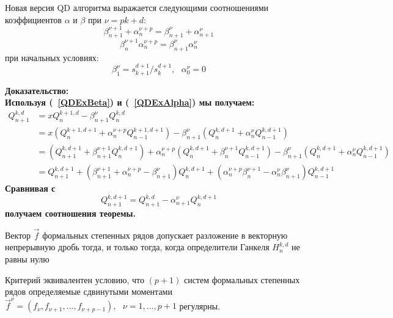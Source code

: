 \begin{teor}
Новая версия QD алгоритма выражается следующими соотношениями
коэффициентов $\alpha$ и $\beta$ при $\nu=pk+d$:
\begin{equation}
\label{QDExRec} \beta_{n+1}^{\nu+1}+\alpha_n^{\nu+p} =
\beta_{n+1}^{\nu}+\alpha_{n+1}^{\nu}
\end{equation}
\begin{equation}
\beta_{n}^{\nu+1}\alpha_n^{\nu+p} =
\beta_{n+1}^{\nu}\alpha_{n}^{\nu}
\end{equation}
при начальных условиях:
\begin{equation}
\beta_1^{\nu} = s^{d+1}_{k+1}/s_{k}^{d+1},\mbox{   }
\alpha_0^{\nu}=0
\end{equation}
\end{teor}
\bf Доказательство: \rm \\
Используя (~\ref{QDExBeta}) и (~\ref{QDExAlpha}) мы получаем:
$$%
\begin{array}{lllllllll}
Q_{n+1}^{k,d} & =xQ_n^{k+1,d}-\beta_{n+1}^{{\nu}} Q_n^{k,d} \\
&
=x(Q_n^{k+1,d+1}+\alpha_n^{\nu+p}Q_{n-1}^{k+1,d+1})-\beta_{n+1}^{{\nu}}
(Q_n^{k,d+1}+\alpha_n^{\nu}Q_{n-1}^{k,d+1}) \\
&
=(Q_{n+1}^{k,d+1}+\beta_{n+1}^{\nu+1}Q_n^{k,d+1})+\alpha_n^{\nu+p}(Q_n^{k,d+1}+\beta_n^{\nu+1}Q_{n-1}^{k,d+1})-\beta_{n+1}^{{\nu}}
(Q_n^{k,d+1}+\alpha_n^{\nu}Q_{n-1}^{k,d+1}) \\
& =
Q_{n+1}^{k,d+1}+(\beta_{n+1}^{\nu+1}+\alpha_{n}^{\nu+p}-\beta_{n+1}^{\nu})Q_n^{k,d+1}+(\alpha_n^{\nu+p}\beta_{n}^{\nu+1}-\alpha_n^{\nu}\beta_{n+1}^{\nu})Q_{n-1}^{k,d+1}
\end{array}
$$%
Сравнивая с $$
Q_{n+1}^{k,d+1}=Q_{n+1}^{k,d}-\alpha_{n+1}^{\nu} Q_{n}^{k,d+1}
$$
получаем соотношения теоремы. \\
\begin{teor} Вектор  $\overrightarrow{f}$ формальных степенных рядов
допускает разложение в векторную непрерывную дробь тогда, и только
тогда, когда определители Ганкеля $H_n^{k,d}$ не равны нулю
\end{teor}
Критерий эквивалентен условию, что $(p+1)$ систем формальных
степенных рядов определяемые сдвинутыми моментами
$\overrightarrow{f}^{\nu}=(f_{\nu},f_{\nu+1},...,f_{\nu+p-1}),
\mbox{   } \nu=1,...,p+1$ регулярны.

